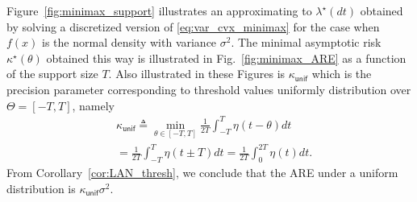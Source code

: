 \documentclass[letterpaper, 11pt]{IEEEtran}      %
\newcommand{\unif}{\mathsf{unif}}
\begin{document}
Figure~\ref{fig:minimax_support} illustrates an approximating to $\lambda^\star(dt)$ obtained by solving a discretized version of \eqref{eq:var_cvx_minimax} for the case when $f(x)$ is the normal density with variance $\sigma^2$. The minimal asymptotic risk $\kappa^\star(\theta)$ obtained this way is illustrated in Fig.~\ref{fig:minimax_ARE} as a function of the support size $T$. Also illustrated in these Figures is $\kappa_{\unif}$ which is the precision parameter corresponding to threshold values uniformly distribution over $\Theta = [-T,T]$, namely
\begin{align}
& \kappa_{\unif} \triangleq \min_{\theta \in [-T,T]} \frac{1}{2T}\int_{-T}^T \eta\left(t-\theta\right) dt \nonumber
 \\
& = 
\frac{1}{2T}\int_{-T}^{T} \eta\left(t\pm T\right) dt
= \frac{1}{2T}\int_{0}^{2T} \eta(t) dt  \label{eq:uniform_risk}. 
\end{align}
From Corollary~\ref{cor:LAN_thresh}, we conclude that the ARE under a uniform distribution is $\kappa_\unif \sigma^2$. \par
\end{document}
